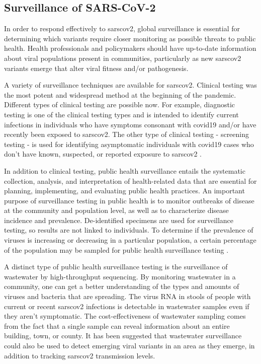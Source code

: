     \subsection{Surveillance of SARS-CoV-2}
    
    In order to respond effectively to \acrshort{sarscov2}, global surveillance is essential for determining which variants require closer monitoring as possible threats to public health. Health professionals and policymakers should have up-to-date information about viral populations present in communities, particularly as new \acrshort{sarscov2} variants emerge that alter viral fitness and/or pathogenesis.
    
    A variety of surveillance techniques are available for \acrshort{sarscov2}. Clinical testing was the most potent and widespread method at the beginning of the pandemic. Different types of clinical testing are possible now. For example, diagnostic testing is one of the clinical testing types and is intended to identify current infections in individuals who have symptoms consonant with \acrshort{covid19} and/or have recently been exposed to \acrshort{sarscov2}. The other type of clinical testing - screening testing - is used for identifying asymptomatic individuals with \acrshort{covid19} cases who don't have known, suspected, or reported exposure to \acrshort{sarscov2} \cite{cdc2020c}.
    
    In addition to clinical testing, public health surveillance entails the systematic collection, analysis, and interpretation of health-related data that are essential for planning, implementing, and evaluating public health practices. An important purpose of surveillance testing in public health is to monitor outbreaks of disease at the community and population level, as well as to characterize disease incidence and prevalence. De-identified specimens are used for surveillance testing, so results are not linked to individuals. To determine if the prevalence of viruses is increasing or decreasing in a particular population, a certain percentage of the population may be sampled for public health surveillance testing \cite{cdc2020c}.
    
    A distinct type of public health surveillance testing is the surveillance of wastewater by high-throughput sequencing. By monitoring wastewater in a community, one can get a better understanding of the types and amounts of viruses and bacteria that are spreading. The virus RNA in stools of people with current or recent \acrshort{sarscov2} infections is detectable in wastewater samples even if they aren't symptomatic. The cost-effectiveness of wastewater sampling comes from the fact that a single sample can reveal information about an entire building, town, or county. It has been suggested that wastewater surveillance could also be used to detect emerging viral variants in an area as they emerge, in addition to tracking \acrshort{sarscov2} transmission levels.
    
